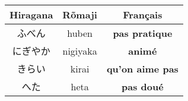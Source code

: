 \documentclass[11pt]{report}
\newenvironment{Japanese}{%
\CJKfamily{min}%
\CJKtilde  
\CJKnospace}{}
\begin{document}
\begin{CJK}{UTF8}{}
\begin{Japanese}
\begin{center}
\begin{multicols}{2}
\begin{tabular}{|c|c|c|}
			\end{tabular}
			\begin{tabular}{|c|c|c|}
				\hline
				\textbf{Hiragana} & \textbf{Rõmaji} & \textbf{Français} \\
				\hline
				ふべん & huben & \textbf{pas pratique} \\%
				\hline
				にぎやか & nigiyaka & \textbf{animé} \\%
				\hline
				きらい & kirai & \textbf{qu'on aime pas} \\%
				\hline
				へた & heta & \textbf{pas doué} \\%
				\hline
			\end{tabular}
		\end{multicols}
	\end{center}
\end{Japanese}  
\end{CJK}
\end{document}
